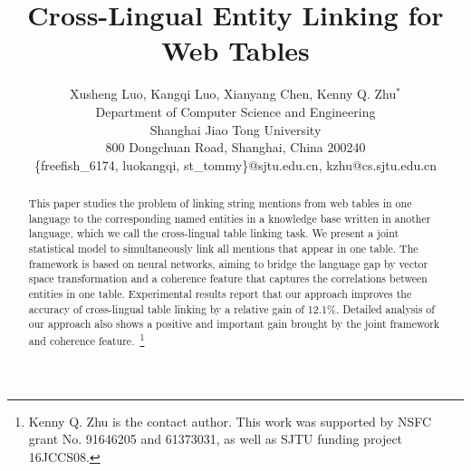 \documentclass[letterpaper]{article} %
\begin{document}
%
\title{Cross-Lingual Entity Linking for Web Tables}
\author{Xusheng Luo,
	Kangqi Luo, Xianyang Chen,
	Kenny Q. Zhu$^*$\\
	Department of Computer Science and Engineering\\
	Shanghai Jiao Tong University\\
	800 Dongchuan Road, Shanghai, China 200240\\
	\{freefish\_6174, luokangqi, st\_tommy\}@sjtu.edu.cn, kzhu@cs.sjtu.edu.cn\\
}
\maketitle
\begin{abstract}
This paper studies the problem of linking string mentions from web tables in one language
to the corresponding named entities in a knowledge base written in another language, 
which we call the cross-lingual table linking task. 
We present a joint statistical model to simultaneously link all mentions that appear in one table.
The framework is based on neural networks, aiming to bridge the language gap by 
vector space transformation and a coherence feature that captures the correlations 
between entities in one table.
Experimental results report that our approach improves the accuracy of cross-lingual table linking
by a relative gain of 12.1\%.
Detailed analysis of our approach also shows a positive and important gain
brought by the joint framework and coherence feature.~\footnote{Kenny Q. Zhu
is the contact author. This work was supported by NSFC grant No. 
91646205 and 61373031, as well as SJTU funding project 16JCCS08.}
\end{abstract}

	
	
	
	
	
	
	
	
	
	
	
\end{document}
